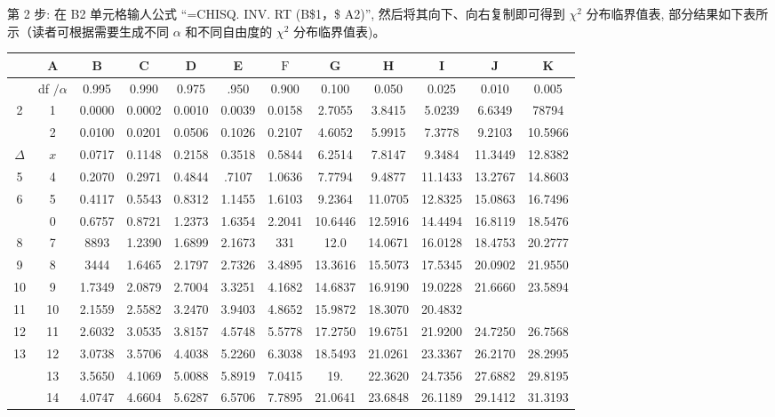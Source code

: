 \documentclass[10pt]{article}
\begin{document}
\begin{CJK*}{UTF8}{bsmi}
第 2 步: 在 B2 单元格输人公式 “=CHISQ. INV. RT (B\$1，\$ A2)”, 然后将其向下、向右复制即可得到 $\chi^{2}$ 分布临界值表, 部分结果如下表所示（读者可根据需要生成不同 $\alpha$ 和不同自由度的 $\chi^{2}$ 分布临界值表)。

\begin{center}
\begin{tabular}{|c|c|c|c|c|c|c|c|c|c|c|c|}
\hline
 & A & B & C & D & E & $\mathrm{F}$ & G & H & I & J & K \\
\hline
 & df $/ \alpha$ & 0.995 & 0.990 & 0.975 & .950 & 0.900 & 0.100 & 0.050 & 0.025 & 0.010 & 0.005 \\
\hline
2 & 1 & 0.0000 & 0.0002 & 0.0010 & 0.0039 & 0.0158 & 2.7055 & 3.8415 & 5.0239 & 6.6349 & 78794 \\
\hline
 & 2 & 0.0100 & 0.0201 & 0.0506 & 0.1026 & 0.2107 & 4.6052 & 5.9915 & 7.3778 & 9.2103 & 10.5966 \\
\hline
$\Delta$ & $x$ & 0.0717 & 0.1148 & 0.2158 & 0.3518 & 0.5844 & 6.2514 & 7.8147 & 9.3484 & 11.3449 & 12.8382 \\
\hline
5 & 4 & 0.2070 & 0.2971 & 0.4844 & .7107 & 1.0636 & 7.7794 & 9.4877 & 11.1433 & 13.2767 & 14.8603 \\
\hline
6 & 5 & 0.4117 & 0.5543 & 0.8312 & 1.1455 & 1.6103 & 9.2364 & 11.0705 & 12.8325 & 15.0863 & 16.7496 \\
\hline
 & 0 & 0.6757 & 0.8721 & 1.2373 & 1.6354 & 2.2041 & 10.6446 & 12.5916 & 14.4494 & 16.8119 & 18.5476 \\
\hline
8 & 7 & 8893 & 1.2390 & 1.6899 & 2.1673 & 331 & 12.0 & 14.0671 & 16.0128 & 18.4753 & 20.2777 \\
\hline
9 & 8 & 3444 & 1.6465 & 2.1797 & 2.7326 & 3.4895 & 13.3616 & 15.5073 & 17.5345 & 20.0902 & 21.9550 \\
\hline
10 & 9 & 1.7349 & 2.0879 & 2.7004 & 3.3251 & 4.1682 & 14.6837 & 16.9190 & 19.0228 & 21.6660 & 23.5894 \\
\hline
11 & 10 & 2.1559 & 2.5582 & 3.2470 & 3.9403 & 4.8652 & 15.9872 & 18.3070 & 20.4832 &  &  \\
\hline
12 & 11 & 2.6032 & 3.0535 & 3.8157 & 4.5748 & 5.5778 & 17.2750 & 19.6751 & 21.9200 & 24.7250 & 26.7568 \\
\hline
13 & 12 & 3.0738 & 3.5706 & 4.4038 & 5.2260 & 6.3038 & 18.5493 & 21.0261 & 23.3367 & 26.2170 & 28.2995 \\
\hline
 & 13 & 3.5650 & 4.1069 & 5.0088 & 5.8919 & 7.0415 & 19. & 22.3620 & 24.7356 & 27.6882 & 29.8195 \\
\hline
 & 14 & 4.0747 & 4.6604 & 5.6287 & 6.5706 & 7.7895 & 21.0641 & 23.6848 & 26.1189 & 29.1412 & 31.3193 \\

\end{tabular}
\end{center}
\end{CJK*}
\end{document}
